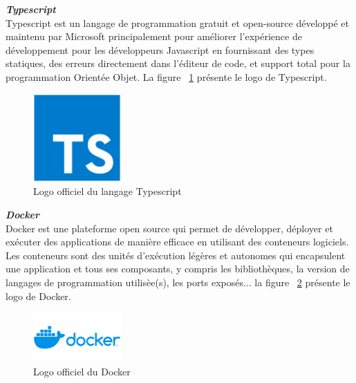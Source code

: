 \noindent
{\small\textbf{\textit{Typescript}}}\mbox{}\\
Typescript est un langage de programmation gratuit et open-source développé et maintenu par Microsoft principalement pour améliorer l'expérience de développement pour les développeurs Javascript en fournissant des types statiques, des erreurs directement dans l'éditeur de code, et support total pour la programmation Orientée Objet. La figure ~\ref{fig:typescript} présente le logo de Typescript.
\begin{figure}[H]
\centering
\includegraphics[width=0.3\textwidth]{logos/typescript.png}
\caption{Logo officiel du langage Typescript}
\label{fig:typescript}
\end{figure}

\noindent
{\small\textbf{\textit{Docker}}}\mbox{}\\
Docker est une plateforme open source qui permet de développer, déployer et exécuter des applications de manière efficace en utilisant des conteneurs logiciels. Les conteneurs sont des unités d'exécution légères et autonomes qui encapsulent une application et tous ses composants, y compris les bibliothèques, la version de langages de programmation utilisèe(s), les ports exposés... 
la figure ~\ref{fig:docker} présente le logo de Docker.
\begin{figure}[H]
\centering
\includegraphics[width=0.3\textwidth]{logos/docker.png}
\caption{Logo officiel du Docker}
\label{fig:docker}
\end{figure}

